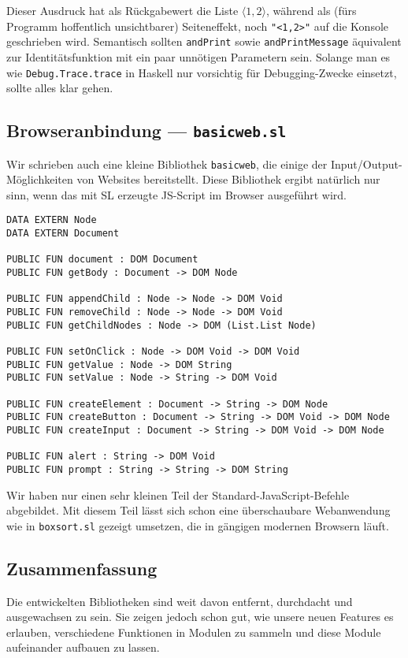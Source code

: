 \documentclass{llncs}
\begin{document}
Dieser Ausdruck hat als Rückgabewert die Liste $\langle1,2\rangle$,
während als (fürs Programm hoffentlich unsichtbarer) Seiteneffekt,
noch \verb|"<1,2>"| auf die Konsole geschrieben wird. Semantisch sollten
\verb|andPrint| sowie \verb|andPrintMessage| äquivalent zur Identitätsfunktion
mit ein paar unnötigen Parametern sein. Solange man es wie
\verb|Debug.Trace.trace| in Haskell nur vorsichtig für Debugging-Zwecke
einsetzt, sollte alles klar gehen.

\subsection{Browseranbindung --- \texttt{basicweb.sl}}

Wir schrieben auch eine kleine Bibliothek \verb|basicweb|, die einige der
Input/Output-Möglichkeiten von Websites bereitstellt. Diese Bibliothek ergibt
natürlich nur sinn, wenn das mit SL erzeugte JS-Script im Browser ausgeführt
wird.

\begin{verbatim}
DATA EXTERN Node
DATA EXTERN Document

PUBLIC FUN document : DOM Document
PUBLIC FUN getBody : Document -> DOM Node

PUBLIC FUN appendChild : Node -> Node -> DOM Void
PUBLIC FUN removeChild : Node -> Node -> DOM Void
PUBLIC FUN getChildNodes : Node -> DOM (List.List Node)

PUBLIC FUN setOnClick : Node -> DOM Void -> DOM Void
PUBLIC FUN getValue : Node -> DOM String
PUBLIC FUN setValue : Node -> String -> DOM Void

PUBLIC FUN createElement : Document -> String -> DOM Node
PUBLIC FUN createButton : Document -> String -> DOM Void -> DOM Node
PUBLIC FUN createInput : Document -> String -> DOM Void -> DOM Node

PUBLIC FUN alert : String -> DOM Void
PUBLIC FUN prompt : String -> String -> DOM String 
\end{verbatim}

Wir haben nur einen sehr kleinen Teil der Standard-JavaScript-Befehle
abgebildet. Mit diesem Teil lässt sich schon eine überschaubare Webanwendung
wie in \verb|boxsort.sl| gezeigt umsetzen, die in gängigen modernen Browsern
läuft.

\subsection{Zusammenfassung}

Die entwickelten Bibliotheken sind weit davon entfernt, durchdacht und
ausgewachsen zu sein. Sie zeigen jedoch schon gut, wie unsere neuen Features
es erlauben, verschiedene Funktionen in Modulen zu sammeln und diese Module
aufeinander aufbauen zu lassen.
\end{document}
